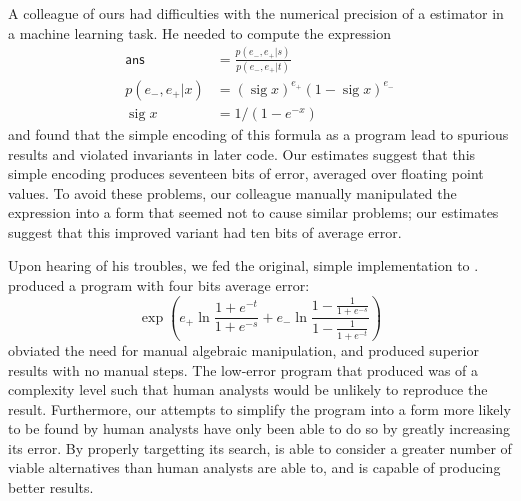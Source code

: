 \documentclass[paper.tex]{subfiles}
\begin{document}
A colleague of ours had difficulties with the numerical precision of a
estimator in a machine learning task.  He needed to compute the
expression
\begin{align*}
\mathsf{ans} &= \frac{p(e_-,e_+|s)}{p(e_-,e_+|t)} \\
p(e_-, e_+|x) &= (\operatorname{sig} x)^{e_+} (1 - \operatorname{sig} x)^{e_-} \\
\operatorname{sig}x &= 1 / (1 - e^{-x})
\end{align*}
and found that the simple encoding of this formula as a program lead
to spurious results and violated invariants in later code.  Our
estimates suggest that this simple encoding produces seventeen bits of
error, averaged over floating point values.  To avoid these problems,
our colleague manually manipulated the expression into a form that
seemed not to cause similar problems; our estimates suggest that this
improved variant had ten bits of average error.

Upon hearing of his troubles, we fed the original, simple
implementation to \casio.  \casio produced a program with four bits
average error:
\begin{equation*}
  \operatorname{exp}\left(e_+\ln{\frac{1+e^{-t}}{1+e^{-s}}} +
     e_-\ln{\frac{1-\frac{1}{1+e^{-s}}}
                 {1-\frac{1}{1+e^{-t}}}}\right)
\end{equation*}
\casio obviated the need for manual algebraic manipulation, and
produced superior results with no manual steps.  The low-error program
that \casio produced was of a complexity level such that human
analysts would be unlikely to reproduce the result.  Furthermore, our
attempts to simplify the program into a form more likely to be found
by human analysts have only been able to do so by greatly increasing
its error.  By properly targetting its search, \casio is able to
consider a greater number of viable alternatives than human analysts
are able to, and is capable of producing better results.
\end{document}
